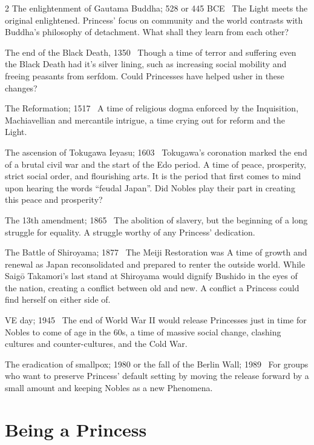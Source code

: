 \begin{multicols}{2}
\textbullet The enlightenment of Gautama Buddha; 528 or 445 BCE \textemdash\, The Light meets the original enlightened. Princess' focus on community and the world contrasts with Buddha's philosophy of detachment. What shall they learn from each other? 

\textbullet The end of the Black Death, 1350 \textemdash\, Though a time of terror and suffering even the Black Death had it's silver lining, such as increasing social mobility and freeing peasants from serfdom. Could Princesses have helped usher in these changes? 

\textbullet The Reformation; 1517 \textemdash\, A time of religious dogma enforced by the Inquisition, Machiavellian and mercantile intrigue, a time crying out for reform and the Light.

\textbullet The ascension of Tokugawa Ieyasu; 1603  \textemdash\, Tokugawa's coronation marked the end of a brutal civil war and the start of the Edo period. A time of peace, prosperity, strict social order, and flourishing arts. It is the period that first comes to mind upon hearing the words \textquotedblleft feudal Japan\textquotedblright . Did Nobles play their part in creating this peace and prosperity?

\textbullet The 13th amendment; 1865 \textemdash\, The abolition of slavery, but the beginning of a long struggle for equality. A struggle worthy of any Princess' dedication. 

\textbullet The Battle of Shiroyama; 1877 \textemdash\, The Meiji Restoration was A  time of growth and renewal as Japan reconsolidated and prepared to renter the outside world. While Saigō Takamori's last stand at Shiroyama would dignify Bushido in the eyes of the nation, creating a conflict between old and new. A conflict a Princess could find herself on either side of. 

\textbullet VE day; 1945 \textemdash\, The end of World War II would release Princesses just in time for Nobles to come of age in the 60s, a time of massive social change, clashing cultures and counter-cultures, and the Cold War.  

\textbullet The eradication of smallpox; 1980 or the fall of the Berlin Wall; 1989 \textemdash\, For groups who want to preserve Princess' default setting by moving the release forward by a small amount and keeping Nobles as a new Phenomena.

\bigsidebarend

\section*{Being a Princess}
\label{sec:BeingAPrincess}


\end{multicols}
